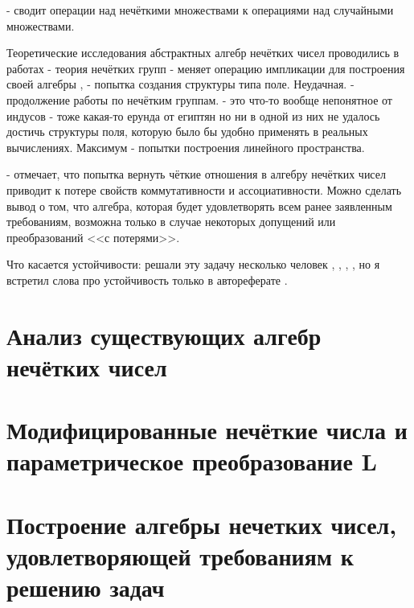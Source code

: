 
\cite{Orlov_Statistics} - сводит операции над нечёткими множествами к операциями над случайными множествами.

Теоретические исследования абстрактных алгебр нечётких чисел проводились в работах
\cite{Rosenfeld_Algebras} - теория нечётких групп
\cite{Novak} - меняет операцию импликации для построения своей алгебры
\cite{Fuzzy_Fields}, \cite{Fuzzy_Fields_Revised} - попытка создания структуры типа поле. Неудачная.
\cite{Commutative_Algebra} - продолжение работы \cite{Rosenfeld_Algebras} по нечётким группам.
\cite{Smarandache} - это что-то вообще непонятное от индусов
\cite{PhD_Egypt} - тоже какая-то ерунда от египтян
но ни в одной из них не удалось достичь структуры поля, которую было бы удобно применять в реальных вычислениях. Максимум - попытки построения линейного пространства.

\cite{Kreinovich_100plus1} - отмечает, что попытка вернуть чёткие отношения в алгебру нечётких чисел приводит к потере свойств коммутативности и ассоциативности. Можно сделать вывод о том, что алгебра, которая будет удовлетворять всем ранее заявленным требованиям, возможна только в случае некоторых допущений или преобразований <<с потерями>>.

Что касается устойчивости: решали эту задачу несколько человек \cite{Matveev_Starodubtsev}, \cite{Matveev_Fuzzy_LP}, \cite{Matveev_PIIT_2011}, \cite{Melkumova_Vestnik}, но я встретил слова про устойчивость только в автореферате \cite{PhD_Starodubtsev}.

\newpage
\section{Анализ существующих алгебр нечётких чисел}
\label{chapter2_1}


\section{Модифицированные нечёткие числа и параметрическое преобразование L}
\label{chapter2_2}


\section{Построение алгебры нечетких чисел, удовлетворяющей требованиям к решению задач} 
\label{chapter2_3}


